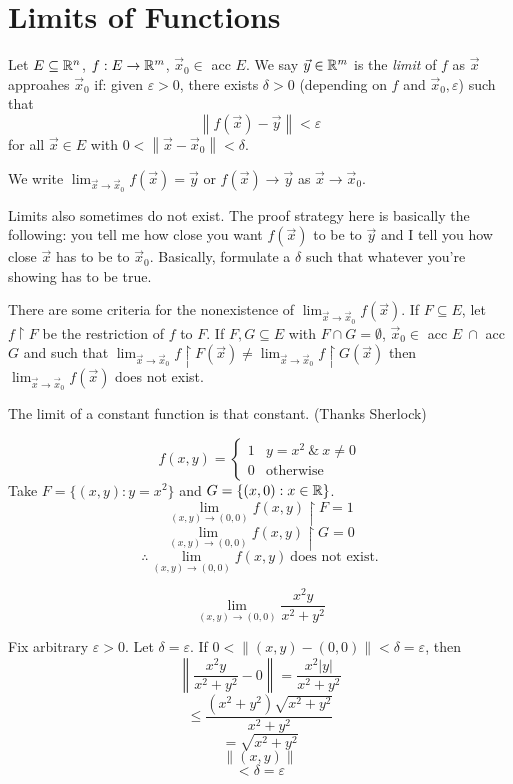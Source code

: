 \documentclass[11pt]{article}
\newcommand{\x}{\vec{x}}
\newcommand{\norm}[1]{\left\lVert #1 \right\rVert}
\newcommand{\y}{\vec{y}}
\newcommand{\ra}{\rightarrow}
\newcommand{\sse}{\subseteq}
\newcommand{\e}{\varepsilon}
\begin{document}
\section{Limits of Functions}
\begin{definition}[Limit of $f(x)$]
    Let $E \sse \R^n$, $f: E \ra \R^m$, $\x_0 \in$ acc $E$. We say $\y \in \R^m$ is the \textit{limit} of $f$ as $\x$ approahes $\x_0$ if: given $\e > 0$, there exists $\delta > 0$ (depending on $f$ and $\x_0, \e$) such that 
    \[\norm{f(\x) - \y} < \e\]
    for all $\x \in E$ with $0 < \norm{\x - \x_0} < \delta.$ \vspace{3mm}

    We write $\displaystyle{\lim_{\x \ra \x_0} f(\x) = \y}$ or $f(\x) \ra \y$ as $\x \ra \x_0$. 

\end{definition}

\begin{remark}
    Limits also sometimes do not exist. The proof strategy here is basically the following: you tell me how close you want $f(\x)$ to be to $\y$ and I tell you how close $\x$ has to be to $\x_0$. Basically, formulate a $\delta$ such that whatever you're showing has to be true. 
\end{remark}

There are some criteria for the nonexistence of $\displaystyle{\lim_{\x \ra \x_0} f(\x)}$. If $F \sse E$, let $f\upharpoonright F$ be the restriction of $f$ to $F$. If $F, G \sse E$ with $F \cap G = \emptyset$, $\x_0 \in$ acc $E \ \cap$ acc $G$ and such that  $\displaystyle{\lim_{\x \ra \x_0} f\upharpoonright F (\x) \neq \lim_{\x \ra \x_0} f\upharpoonright G (\x) }$ then $\displaystyle{\lim_{\x \ra \x_0} f(\x)}$ does not exist. 

\begin{remark}
    The limit of a constant function is that constant. (Thanks Sherlock)
\end{remark}

\begin{example}
    \[f(x,y) = \begin{cases} 
        1 & y = x^2 \ \& \ x \neq 0 \\
        0 & \text{otherwise}
     \end{cases}
  \]
    Take $F = \{(x,y): y = x^2\}$ and $G = \{(x,0): x \in \mathbb{R}\}$.
    \[\lim_{(x,y) \ra (0,0)} f(x,y) \upharpoonright F = 1\]
    \[\lim_{(x,y) \ra (0,0)} f(x,y) \upharpoonright G = 0\]
    \[\therefore \lim_{(x,y) \ra (0,0)} f(x,y) \ \text{does not exist.}\]
\end{example}
\newpage
\begin{example}
    \[\lim_{(x,y) \ra (0,0)} \frac{x^2y}{x^2 + y^2}\]
    \begin{solution}
        Fix arbitrary $\e > 0$. Let $\delta = \e$. If $0 < \norm{(x,y) - (0,0)} < \delta = \e$, then 
        \[\norm{\frac{x^2y}{x^2 + y^2} - 0} = \frac{x^2|y|}{x^2 + y^2}\]
        \[\leq \frac{(x^2 + y^2) \sqrt{x^2 + y^2}}{x^2 + y^2}\]
        \[ = \sqrt{x^2 + y^2}\]
        \[\norm{(x,y)}\]
        \[< \delta = \e\]
    \end{solution}
\end{example}
\end{document}
